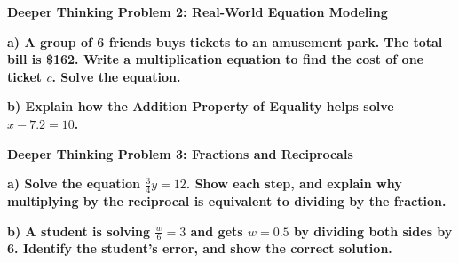 \documentclass[12pt, letterpaper, fleqn]{article}
\begin{document}
\vspace{4mm}

\begin{tcolorbox}[colback=black!5, colframe=black!50, boxrule=1pt, arc=4mm, left=6mm, right=6mm, top=5mm, bottom=5mm]
\textbf{Deeper Thinking Problem 2: Real-World Equation Modeling}

\medskip

\noindent
\textbf{a) A group of 6 friends buys tickets to an amusement park. The total bill is \$162. Write a multiplication equation to find the cost of one ticket $c$. Solve the equation.}

\vspace{2.5cm}

\noindent
\textbf{b) Explain how the Addition Property of Equality helps solve $x - 7.2 = 10$.}

\vspace{2cm}
\end{tcolorbox}
\newpage

\begin{tcolorbox}[colback=black!5, colframe=black!50, boxrule=1pt, arc=4mm, left=6mm, right=6mm, top=5mm, bottom=5mm]
\textbf{Deeper Thinking Problem 3: Fractions and Reciprocals}

\medskip

\noindent
\textbf{a) Solve the equation $\frac{3}{4}y = 12$. Show each step, and explain why multiplying by the reciprocal is equivalent to dividing by the fraction.}

\vspace{2.5cm}

\noindent
\textbf{b) A student is solving $\frac{w}{6} = 3$ and gets $w = 0.5$ by dividing both sides by 6. Identify the student's error, and show the correct solution.}

\vspace{2.5cm}
\end{tcolorbox}
\newpage
\end{document}
